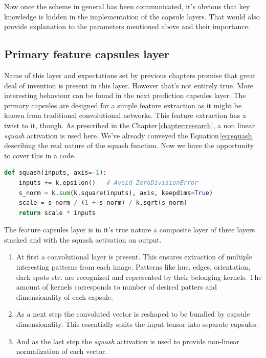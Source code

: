 Now once the scheme in general has been communicated, it's obvious that key knowledge is hidden in the implementation of the capsule layers. That would also provide explanation to the parameters mentioned above and their importance.

\subsection{Primary feature capsules layer}

Name of this layer and expectations set by previous chapters promise that great deal of invention is present in this layer. However that's not entirely true. More interesting behaviour can be found in the next prediction capsules layer. The primary capsules are designed for a simple feature extraction as it might be known from traditional convolutional networks. This feature extraction has a twist to it, though. As prescribed in the Chapter\,\ref{chapter:research}, a non linear \textit{squash} activation is used here. We've already conveyed the Equation\,\ref{eq:squash} describing the real nature of the squash function. Now we have the opportunity to cover this in a code.

\begin{lstlisting}[language=Python, caption=Squash activation.]
def squash(inputs, axis=-1):
    inputs += k.epsilon()   # Avoid ZeroDivisionError
    s_norm = k.sum(k.square(inputs), axis, keepdims=True)
    scale = s_norm / (1 + s_norm) / k.sqrt(s_norm)
    return scale * inputs
\end{lstlisting}

The feature capsules layer is in it's true nature a composite layer of three layers stacked and with the squash activation on output.

\begin{enumerate}
    \item At first a convolutional layer is present. This ensures extraction of multiple interesting patterns from each image. Patterns like hue, edges, orientation, dark spots etc. are recognized and represented by their belonging kernels. The amount of kernels corresponds to number of desired patters and dimensionality of each capsule.
    \item As a next step the convoluted vector is reshaped to be bundled by capsule dimensionality. This essentially splits the input tensor into separate capsules.
    \item And as the last step the \textit{squash} activation is used to provide non-linear normalization of each vector.
\end{enumerate}

